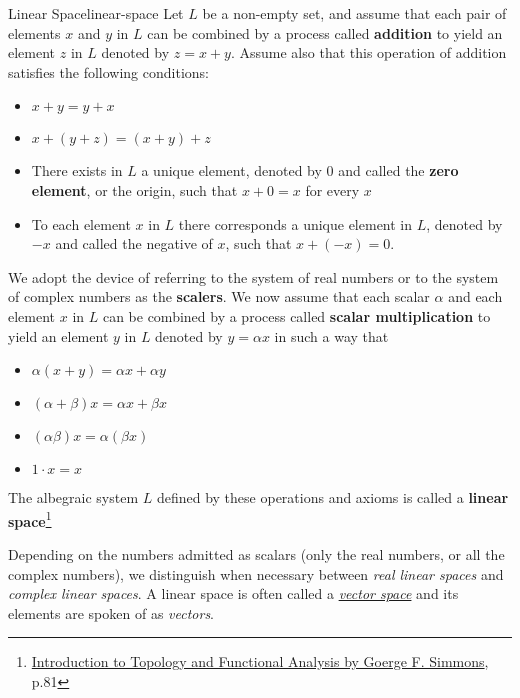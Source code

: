 \begin{Definition}{Linear Space}{linear-space}
    Let $L$ be a non-empty set, and assume that each pair of elements $x$ and $y$ in $L$ can be combined by a process
    called \textbf{addition} to yield an element $z$ in $L$ denoted by $z = x + y$. Assume also that this operation of
    addition satisfies the following conditions:

    \begin{itemize}
        \item $x + y = y + x$
        \item $x + (y + z) = (x + y) + z$
        \item There exists in $L$ a unique element, denoted by $0$ and called the \textbf{zero element}, or the origin,
              such that $x + 0 = x$ for every $x$
        \item To each element $x$ in $L$ there corresponds a unique element in $L$, denoted by $-x$ and called the
              negative of $x$, such that $x + (-x) = 0$.
    \end{itemize}

    We adopt the device of referring to the system of real numbers or to the system of complex numbers as the
    \textbf{scalers}. We now assume that each scalar $\alpha$ and each element $x$ in $L$ can be combined by a process
    called \textbf{scalar multiplication} to yield an element $y$ in $L$ denoted by $y = \alpha x$ in such a way that

    \begin{itemize}
        \item $\alpha(x + y) = \alpha x + \alpha y$
        \item $(\alpha + \beta)x = \alpha x + \beta x$
        \item $(\alpha\beta)x = \alpha(\beta x)$
        \item $1 \cdot x = x$
    \end{itemize}

    The albegraic system $L$ defined by these operations and axioms is called a
    \textbf{linear space}\footnote{\href{https://trello.com/c/3EPccNTa}{Introduction to Topology and Functional Analysis by Goerge F. Simmons}, p.81}
\end{Definition}

Depending on the numbers admitted as scalars (only the real numbers, or all the complex numbers), we distinguish when
necessary between \textit{real linear spaces} and \textit{complex linear spaces}. A linear space is often called a
\hyperlink{vector-space}{\textit{vector space}} and its elements are spoken of as \textit{vectors}.

